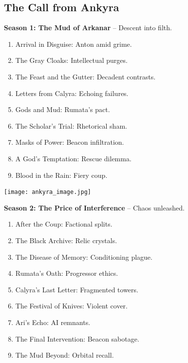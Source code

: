 \documentclass[10pt,letterpaper]{article}
\begin{document}
\begin{paracol}{2}
\switchcolumn

\subsection{The Call from Ankyra}
\textbf{Season 1: The Mud of Arkanar} – Descent into filth.
\begin{enumerate}[leftmargin=0pt,itemsep=0pt]
    \item Arrival in Disguise: Anton amid grime.
    \item The Gray Cloaks: Intellectual purges.
    \item The Feast and the Gutter: Decadent contrasts.
    \item Letters from Calyra: Echoing failures.
    \item Gods and Mud: Rumata's pact.
    \item The Scholar’s Trial: Rhetorical sham.
    \item Masks of Power: Beacon infiltration.
    \item A God’s Temptation: Rescue dilemma.
    \item Blood in the Rain: Fiery coup.
\end{enumerate}

\begin{center}
\texttt{[image: ankyra\_image.jpg]} %
\end{center}

\textbf{Season 2: The Price of Interference} – Chaos unleashed.
\begin{enumerate}[leftmargin=0pt,itemsep=0pt]
    \item After the Coup: Factional splits.
    \item The Black Archive: Relic crystals.
    \item The Disease of Memory: Conditioning plague.
    \item Rumata’s Oath: Progressor ethics.
    \item Calyra’s Last Letter: Fragmented towers.
    \item The Festival of Knives: Violent cover.
    \item Ari’s Echo: AI remnants.
    \item The Final Intervention: Beacon sabotage.
    \item The Mud Beyond: Orbital recall.
\end{enumerate}

\end{paracol}
\end{document}
